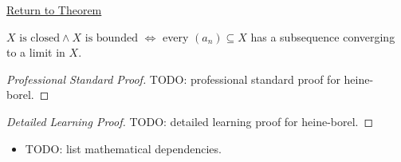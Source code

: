 \newpage
{}
\label{prf:heine-borel}

\begin{remark*}[Return]
\hyperref[thm:heine-borel-subsets-real-line]{Return to Theorem}
\end{remark*}

\begin{theorem*}
$X\text{ is closed} \wedge X\text{ is bounded}$
$\iff$ every $(a_n)\subseteq X$ has a subsequence converging to
a limit in $X$.

\smallskip\noindent
\end{theorem*}

\begin{proof}[Professional Standard Proof]
\LRAProofBodyStart
TODO: professional standard proof for heine-borel.
\end{proof}

\begin{proof}[Detailed Learning Proof]
\LRAProofBodyStart
TODO: detailed learning proof for heine-borel.
\end{proof}

\begin{remark*}
\end{remark*}

\begin{dependencies}
\begin{itemize}
  \item TODO: list mathematical dependencies.
\end{itemize}
\end{dependencies}

\clearpage
